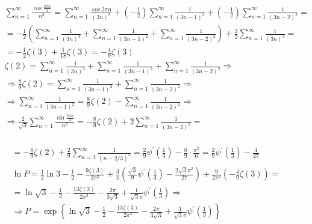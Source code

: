 	$$
	\begin{aligned}
		& \sum_{n=1}^{\infty} \frac{\cos \frac{2 \pi n}{3}}{n^3}=\sum_{n=1}^{\infty} \frac{\cos 2 \pi n}{(3 n)^3}+\left(-\frac{1}{2}\right) \sum_{n=1}^{\infty} \frac{1}{(3 n-1)^3}+\left(-\frac{1}{2}\right) \sum_{n=1}^{\infty} \frac{1}{(3 n-2)^2}= \\
		& =-\frac{1}{2}\left(\sum_{n=1}^{\infty} \frac{1}{(3 n)^3}+\sum_{n=1}^{\infty} \frac{1}{(3 n-1)^2}+\sum_{n=1}^{\infty} \frac{1}{(3 n-2)^2}\right)+\frac{3}{2} \sum_{n=1}^{\infty} \frac{1}{(3 n)^3}= \\
		& =-\frac{1}{2} \zeta(3)+\frac{1}{18} \zeta(3)=-\frac{4}{9} \zeta(3) \\
		& \zeta(2)=\sum_{n=1}^{\infty} \frac{1}{(3 n)^2}+\sum_{n=1}^{\infty} \frac{1}{(3 n-1)^2}+\sum_{n=1}^{\infty} \frac{1}{(3 n-2)^2} \Rightarrow \\
		& \Rightarrow \frac{8}{9} \zeta(2)=\sum_{n=1}^{\infty} \frac{1}{(3 n-1)^2}+\sum_{n=1}^{\infty} \frac{1}{(3 n-2)^2} \Rightarrow \\
		& \Rightarrow \sum_{n=1}^{\infty} \frac{1}{(3 n-1)^2}=\frac{8}{9} \zeta(2)-\sum_{n=1}^{\infty} \frac{1}{(3 n-2)^2} \Rightarrow \\
		& \Rightarrow \frac{2}{\sqrt{3}} \sum_{n=1}^{\infty} \frac{\sin \frac{2 \pi n}{3}}{n^2}=-\frac{8}{9} \zeta(2)+2 \sum_{n=1}^{\infty} \frac{1}{(3 n-2)^2}= \\
		&
	\end{aligned}
	$$
	
	$$
	\begin{gathered}
		=-\frac{8}{9} \zeta(2)+\frac{2}{9} \sum_{n=1}^{\infty} \frac{1}{(n-2 / 3)^2}=\frac{2}{9} \psi^{\prime}\left(\frac{1}{3}\right)-\frac{8}{9} \cdot \frac{\pi^2}{6}=\frac{2}{9} \psi^{\prime}\left(\frac{1}{3}\right)-\frac{4}{27} \\
		\ln P=\frac{1}{2} \ln 3-\frac{1}{2}-\frac{9 \zeta(3)}{2 \pi^2}+\frac{3}{\pi}\left(\frac{\sqrt{3}}{9} \psi^{\prime}\left(\frac{1}{3}\right)-\frac{2 \sqrt{3} \pi^2}{27}\right)+\frac{9}{2 \pi^2}\left(-\frac{4}{9} \zeta(3)\right)= \\
		=\ln \sqrt{3}-\frac{1}{2}-\frac{13 \zeta(3)}{2 \pi^2}-\frac{2 \pi}{3 \sqrt{3}}+\frac{1}{\sqrt{3} \pi} \psi^{\prime}\left(\frac{1}{3}\right) \Rightarrow \\
		\Rightarrow P=\exp \left\{\ln \sqrt{3}-\frac{1}{2}-\frac{13 \zeta(3)}{2 \pi^2}-\frac{2 \pi}{3 \sqrt{3}}+\frac{1}{\sqrt{3} \pi} \psi^{\prime}\left(\frac{1}{3}\right)\right\}
	\end{gathered}
	$$
	
